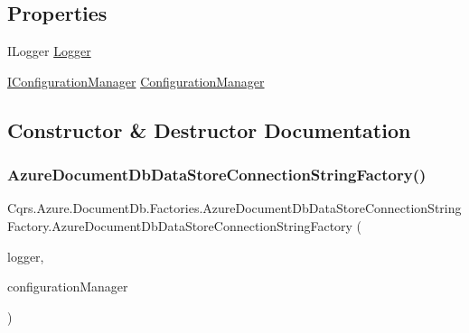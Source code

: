 \subsection*{Properties}
\begin{DoxyCompactItemize}
\item 
I\+Logger \hyperlink{classCqrs_1_1Azure_1_1DocumentDb_1_1Factories_1_1AzureDocumentDbDataStoreConnectionStringFactory_aa195f69522b48a21dc36db3ce64260e2_aa195f69522b48a21dc36db3ce64260e2}{Logger}
\item 
\hyperlink{interfaceCqrs_1_1Configuration_1_1IConfigurationManager}{I\+Configuration\+Manager} \hyperlink{classCqrs_1_1Azure_1_1DocumentDb_1_1Factories_1_1AzureDocumentDbDataStoreConnectionStringFactory_a7d0a40bb03e9e15306023bf97094cf60_a7d0a40bb03e9e15306023bf97094cf60}{Configuration\+Manager}
\end{DoxyCompactItemize}


\subsection{Constructor \& Destructor Documentation}
\mbox{\label{classCqrs_1_1Azure_1_1DocumentDb_1_1Factories_1_1AzureDocumentDbDataStoreConnectionStringFactory_a9b08d89df792a20e71f5278dbf39b804_a9b08d89df792a20e71f5278dbf39b804}} 
\subsubsection{\texorpdfstring{Azure\+Document\+Db\+Data\+Store\+Connection\+String\+Factory()}{AzureDocumentDbDataStoreConnectionStringFactory()}}
{\footnotesize\ttfamily Cqrs.\+Azure.\+Document\+Db.\+Factories.\+Azure\+Document\+Db\+Data\+Store\+Connection\+String\+Factory.\+Azure\+Document\+Db\+Data\+Store\+Connection\+String\+Factory (\begin{DoxyParamCaption}\item[{I\+Logger}]{logger,  }\item[{\hyperlink{interfaceCqrs_1_1Configuration_1_1IConfigurationManager}{I\+Configuration\+Manager}}]{configuration\+Manager }\end{DoxyParamCaption})}



